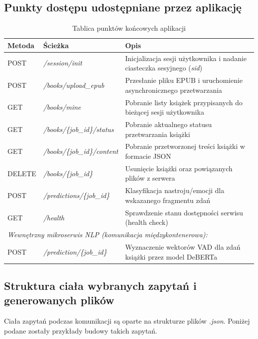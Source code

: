 \subsection{Punkty dostępu udostępniane przez aplikację}
\begin{table}[htbp]
      \center
      \caption{Tablica punktów końcowych aplikacji}
      \label{tab:endpoints}
      \begin{tabular}{l l p{7cm}}
          \toprule
          Metoda & Ścieżka & Opis \\
          \midrule
          POST   & \textit{/session/init}            & Inicjalizacja sesji
          użytkownika i nadanie ciasteczka sesyjnego (\textit{sid}) \\
          POST   & \textit{/books/upload\_epub}      & Przesłanie pliku EPUB
          i uruchomienie asynchronicznego przetwarzania \\
          GET    & \textit{/books/mine}              & Pobranie listy książek
          przypisanych do bieżącej sesji użytkownika \\
          GET    & \textit{/books/\{job\_id\}/status}  & Pobranie aktualnego
          statusu przetwarzania książki \\
          GET    & \textit{/books/\{job\_id\}/content} & Pobranie
          przetworzonej treści książki w formacie JSON \\
          DELETE & \textit{/books/\{job\_id\}}        & Usunięcie książki
          oraz powiązanych plików z serwera \\
          POST   & \textit{/predictions/\{job\_id\}}  & Klasyfikacja
          nastroju/emocji dla wskazanego fragmentu zdań \\
          GET    & \textit{/health}                  & Sprawdzenie stanu
          dostępności serwisu (health check) \\
          \midrule[\heavyrulewidth]
          \multicolumn{3}{l}{\textit{Wewnętrzny mikroserwis NLP (komunikacja
          międzykontenerowa):}} \\
          \midrule
          POST   & \textit{/prediction/\{job\_id\}}   & Wyznaczenie wektorów 
          VAD dla zdań książki przez model DeBERTa \\
          \bottomrule

      \end{tabular}
\end{table}




\FloatBarrier
\subsection{Struktura ciała wybranych zapytań i generowanych plików}
Ciała zapytań podczas komunikacji są oparte na strukturze plików \textit{.json}. Poniżej podane
zostały przykłady budowy takich zapytań.
